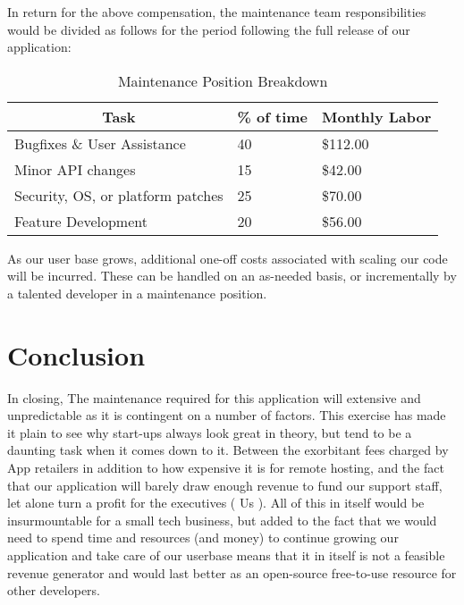 \documentclass{roffin}
\begin{document}
In return for the above compensation, the maintenance team responsibilities would be divided as follows for the period following the full release of our application:

\begin{table}[!h]
\centering
\caption{Maintenance Position Breakdown}
\label{my-label}
\begin{tabular}{|l|l|l|}
\hline
\multicolumn{1}{|c|}{\textbf{Task}} & \multicolumn{1}{c|}{\textbf{\% of time}} & \textbf{Monthly Labor} \\ \hline
Bugfixes \& User Assistance                  & 40                                               & \$112.00                       \\ \hline
Minor API changes                             & 15                                               & \$42.00                        \\ \hline
Security, OS, or platform patches             & 25                                               & \$70.00                        \\ \hline
Feature Development              & 20                                               & \$56.00                        \\ \hline
\end{tabular}
\end{table}

As our user base grows, additional one-off costs associated with scaling our code will be incurred.  These can be handled on an as-needed basis, or incrementally by a talented developer in a maintenance position.

\section{Conclusion}
In closing, The maintenance required for this application will extensive and unpredictable as it is contingent on a number of factors. This exercise has made it plain to see why start-ups always look great in theory, but tend to be a daunting task when it comes down to it. Between the exorbitant fees charged by App retailers in addition to how expensive it is for remote hosting, and the fact that our application will barely draw enough revenue to fund our support staff, let alone turn a profit for the executives ( Us ). All of this in itself would be insurmountable for a small tech business, but added to the fact that we would need to spend time and resources (and money) to continue growing our application and take care of our userbase means that it in itself is not a feasible revenue generator and would last better as an open-source free-to-use resource for other developers. 
\end{document}
